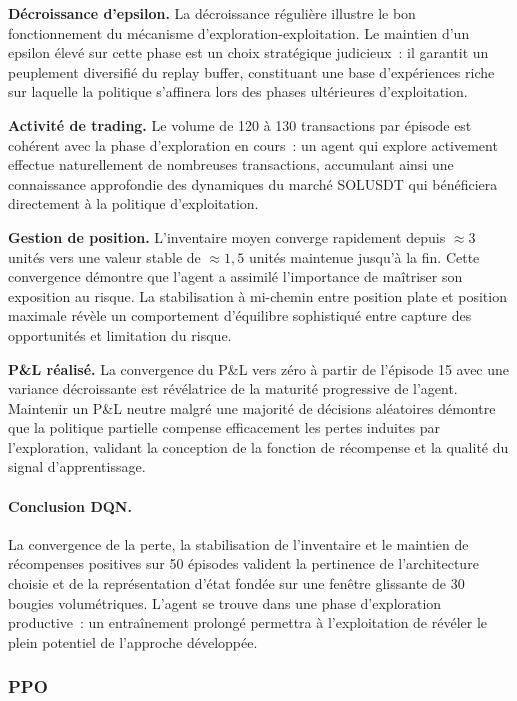 \documentclass[11pt,a4paper]{article}
\begin{document}
\textbf{Décroissance d'epsilon.}
La décroissance régulière illustre le bon fonctionnement
du mécanisme d'exploration-exploitation. Le maintien d'un epsilon élevé sur cette
phase est un choix stratégique judicieux~: il garantit un peuplement diversifié
du replay buffer, constituant une base d'expériences riche sur laquelle la politique
s'affinera lors des phases ultérieures d'exploitation.

\textbf{Activité de trading.}
Le volume de 120 à 130 transactions par épisode est cohérent avec la phase d'exploration
en cours~: un agent qui explore activement effectue naturellement de nombreuses
transactions, accumulant ainsi une connaissance approfondie des dynamiques du marché
SOLUSDT qui bénéficiera directement à la politique d'exploitation.

\textbf{Gestion de position.}
L'inventaire moyen converge rapidement depuis $\approx 3$ unités vers une valeur
stable de $\approx 1{,}5$ unités maintenue jusqu'à la fin. Cette convergence
démontre que l'agent a assimilé l'importance de maîtriser son exposition au risque.
La stabilisation à mi-chemin entre position plate et position maximale révèle
un comportement d'équilibre sophistiqué entre capture des opportunités et limitation du risque.

\textbf{P\&L réalisé.}
La convergence du P\&L vers zéro à partir de l'épisode 15 avec une variance
décroissante est révélatrice de la maturité progressive de l'agent. Maintenir
un P\&L neutre malgré une majorité de décisions aléatoires démontre que la politique
partielle compense efficacement les pertes induites par l'exploration, validant
la conception de la fonction de récompense et la qualité du signal d'apprentissage.

\paragraph{Conclusion DQN.}
La convergence de la perte, la stabilisation de l'inventaire et le maintien de
récompenses positives sur 50 épisodes valident la pertinence de l'architecture
choisie et de la représentation d'état fondée sur une fenêtre glissante de
30 bougies volumétriques. L'agent se trouve dans une phase d'exploration productive~:
un entraînement prolongé permettra à l'exploitation de révéler le plein potentiel
de l'approche développée.
\subsubsection{PPO}
\end{document}
